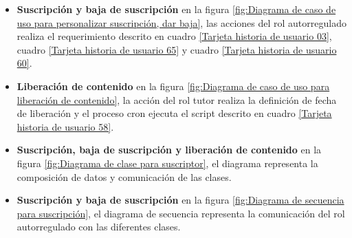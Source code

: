 \begin{itemize}

\item \textbf{Suscripción y baja de suscripción}
en la figura \ref{fig:Diagrama de caso de uso para personalizar suscripción, dar baja},
las acciones del rol autorregulado realiza el requerimiento descrito en cuadro
\ref{Tarjeta historia de usuario 03}, cuadro 
\ref{Tarjeta historia de usuario 65} y cuadro
\ref{Tarjeta historia de usuario 60}.

\begin{minipage}{1.0\textwidth}
	\centering
	\label{fig:Diagrama de caso de uso para personalizar suscripción, dar baja}
\end{minipage}

\item \textbf{Liberación de contenido} en la figura 
\ref{fig:Diagrama de caso de uso para liberación de contenido}, la acción del
rol tutor realiza la definición de fecha de liberación y el proceso cron
ejecuta el script descrito en cuadro \ref{Tarjeta historia de usuario 58}.

\begin{minipage}{1.0\textwidth}
	\centering
	\label{fig:Diagrama de caso de uso para liberación de contenido}
\end{minipage}

\item \textbf{Suscripción, baja de suscripción y liberación de contenido}
en la figura \ref{fig:Diagrama de clase para suscriptor}, el diagrama
representa la composición de datos y comunicación de las clases.

\begin{minipage}{1.0\textwidth}
	\centering
	\label{fig:Diagrama de clase para suscriptor}
\end{minipage}

\item \textbf{Suscripción y baja de suscripción}
en la figura \ref{fig:Diagrama de secuencia para suscripción}, el diagrama
de secuencia representa la comunicación del rol autorregulado con las
diferentes clases.


\end{itemize}
